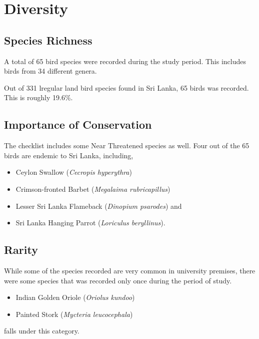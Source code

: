 \chapter{Diversity}
\label{cp:Diversity}

\section{Species Richness}
A total of 65 bird species were recorded during the study period. This includes birds from 34 different genera. 

Out of 331 lregular land bird species found in Sri Lanka, 65 birds was recorded. This is roughly 19.6\%.


\section{Importance of Conservation}
The checklist includes some Near Threatened species as well. Four out of the 65 birds are endemic to Sri Lanka, including,
\begin{itemize}
    \item Ceylon Swallow (\textit{Cecropis hyperythra})
\item Crimson-fronted Barbet (\textit{Megalaima rubricapillus})
\item Lesser Sri Lanka Flameback (\textit{Dinopium psarodes}) and
 \item Sri Lanka Hanging Parrot (\textit{Loriculus beryllinus}).
\end{itemize}

\section{Rarity}
While some of the species recorded are very common in university premises, there were some species that was recorded only once during the period of study.
\begin{itemize}
    \item Indian Golden Oriole (\textit{Oriolus kundoo})
    \item Painted Stork (\textit{Mycteria leucocephala})
\end{itemize}
falls under this category.
